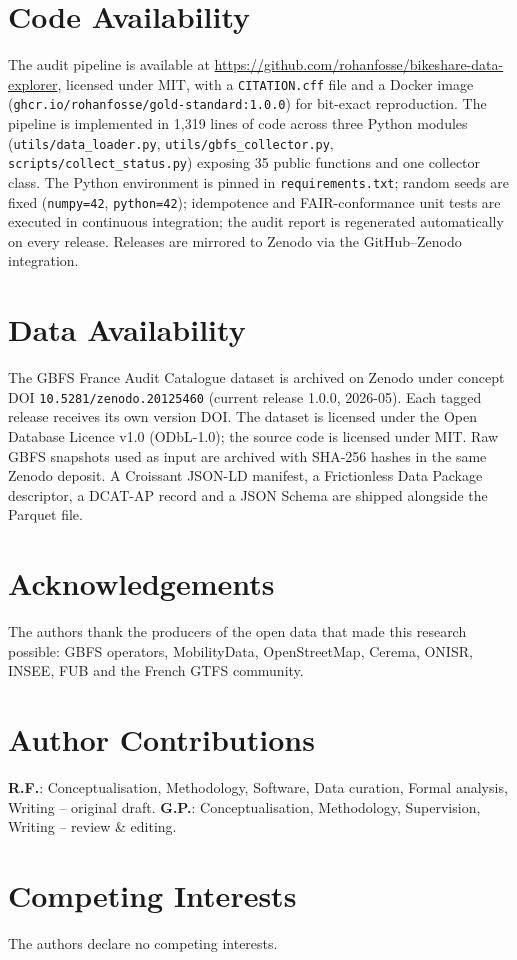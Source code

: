 \documentclass[11pt,a4paper]{article}
\begin{document}
\section*{Code Availability}\label{secCode}

The audit pipeline is available at
\url{https://github.com/rohanfosse/bikeshare-data-explorer}, licensed
under MIT, with a \texttt{CITATION.cff} file and a Docker image
(\texttt{ghcr.io/rohanfosse/gold-standard:1.0.0}) for bit-exact
reproduction. The pipeline is implemented in 1{,}319 lines of code
across three Python modules (\texttt{utils/data\_loader.py},
\texttt{utils/gbfs\_collector.py},
\texttt{scripts/collect\_status.py}) exposing 35 public functions and
one collector class. The Python environment is pinned in
\texttt{requirements.txt}; random seeds are fixed
(\texttt{numpy=42}, \texttt{python=42}); idempotence and FAIR-conformance
unit tests are executed in continuous integration; the audit report
is regenerated automatically on every release. Releases are mirrored
to Zenodo via the GitHub--Zenodo integration.

\section*{Data Availability}\label{secData}

The GBFS France Audit Catalogue dataset is archived on Zenodo under
concept DOI \texttt{10.5281/zenodo.20125460} (current release 1.0.0,
2026-05). Each tagged release receives its own version DOI. The
dataset is licensed under the Open Database Licence v1.0 (ODbL-1.0);
the source code is licensed under MIT. Raw GBFS snapshots used as
input are archived with SHA-256 hashes in the same Zenodo deposit.
A Croissant JSON-LD manifest, a Frictionless Data Package descriptor,
a DCAT-AP record and a JSON Schema are shipped alongside the Parquet
file.

\section*{Acknowledgements}
The authors thank the producers of the open data that made this
research possible: GBFS operators, MobilityData, OpenStreetMap, Cerema,
ONISR, INSEE, FUB and the French GTFS community.

\section*{Author Contributions}
\textbf{R.F.}: Conceptualisation, Methodology, Software, Data
curation, Formal analysis, Writing -- original draft.
\textbf{G.P.}: Conceptualisation, Methodology, Supervision,
Writing -- review \& editing.

\section*{Competing Interests}
The authors declare no competing interests.



\end{document}
